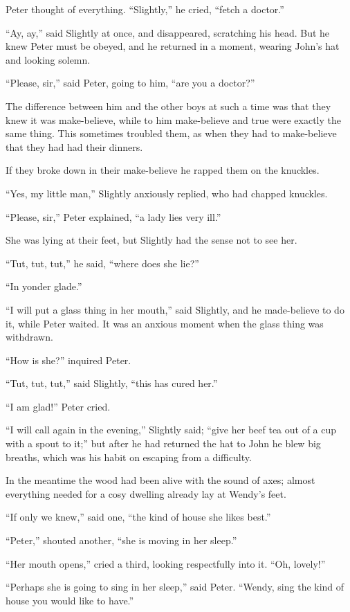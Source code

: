 Peter thought of everything.
“Slightly,” he cried, “fetch a doctor.”

“Ay, ay,” said Slightly at once, and disappeared, scratching his head.
But he knew Peter must be obeyed, and he returned in a moment, wearing John’s hat and looking solemn.

“Please, sir,” said Peter, going to him, “are you a doctor?”

The difference between him and the other boys at such a time was that they knew it was make-believe,
while to him make-believe and true were exactly the same thing.
This sometimes troubled them, as when they had to make-believe that they had had their dinners.

If they broke down in their make-believe he rapped them on the knuckles.

“Yes, my little man,” Slightly anxiously replied, who had chapped knuckles.

“Please, sir,” Peter explained, “a lady lies very ill.”

She was lying at their feet, but Slightly had the sense not to see her.

“Tut, tut, tut,” he said, “where does she lie?”

“In yonder glade.”

“I will put a glass thing in her mouth,” said Slightly,
and he made-believe to do it, while Peter waited.
It was an anxious moment when the glass thing was withdrawn.

“How is she?\@” inquired Peter.

“Tut, tut, tut,” said Slightly, “this has cured her.”

“I am glad!\@” Peter cried.

“I will call again in the evening,” Slightly said;
“give her beef tea out of a cup with a spout to it;”
but after he had returned the hat to John he blew big breaths,
which was his habit on escaping from a difficulty.

In the meantime the wood had been alive with the sound of axes;
almost everything needed for a cosy dwelling already lay at Wendy’s feet.

“If only we knew,” said one, “the kind of house she likes best.”

“Peter,” shouted another, “she is moving in her sleep.”

“Her mouth opens,” cried a third, looking respectfully into it.
“Oh, lovely!”

“Perhaps she is going to sing in her sleep,” said Peter.
“Wendy, sing the kind of house you would like to have.”

